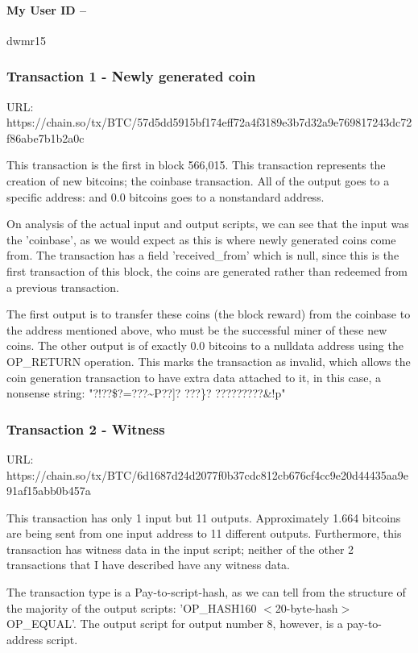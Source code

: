 \documentclass[11pt]{article}
\begin{document}
	\paragraph{My User ID -- } dwmr15
	
	\subsubsection*{Transaction 1 - Newly generated coin}
	URL: https://chain.so/tx/BTC/57d5dd5915bf174eff72a4f3189e3b7d32a9e769817243dc72f86abe7b1b2a0c \newline
	
	This transaction is the first in block 566,015. This transaction represents the creation of new bitcoins; the coinbase transaction. All of the output goes to a specific address:  and 0.0 bitcoins goes to a nonstandard address.
	
	On analysis of the actual input and output scripts, we can see that the input was the 'coinbase', as we would expect as this is where newly generated coins come from. The transaction has a field 'received\_from' which is null, since this is the first transaction of this block, the coins are generated rather than redeemed from a previous transaction. 
	
	The first output is to transfer these coins (the block reward) from the coinbase to the address mentioned above, who must be the successful miner of these new coins. The other output is of exactly 0.0 bitcoins to a nulldata address using the OP\_RETURN operation. This marks the transaction as invalid, which allows the coin generation transaction to have extra data attached to it, in this case, a nonsense string: "?!??\$?=???\textasciitilde P??]? ???\}? ?????????\&!p"
	
	
	\subsubsection*{Transaction 2 - Witness}
	URL: https://chain.so/tx/BTC/6d1687d24d2077f0b37cdc812cb676cf4cc9e20d44435aa9e91af15abb0b457a \newline
	
	This transaction has only 1 input but 11 outputs. Approximately 1.664 bitcoins are being sent from one input address to 11 different outputs. Furthermore, this transaction has witness data in the input script; neither of the other 2 transactions that I have described have any witness data.
	
	The transaction type is a Pay-to-script-hash, as we can tell from the structure of the majority of the output scripts: 'OP\_HASH160 $<$20-byte-hash$>$ OP\_EQUAL'. The output script for output number 8, however, is a pay-to-address script.
	
\end{document}
